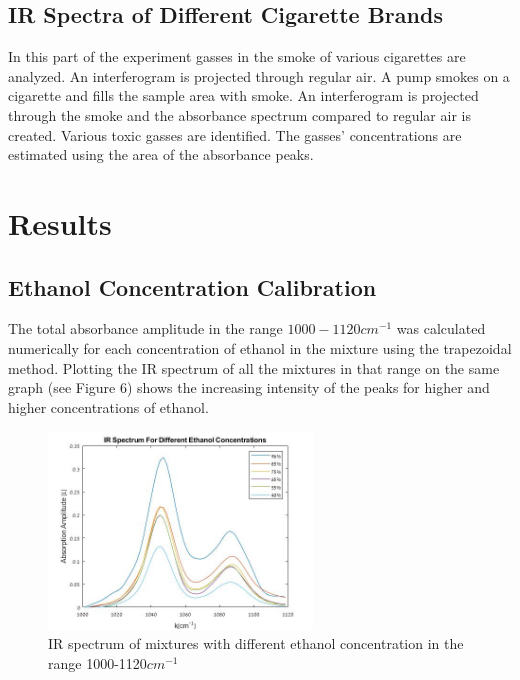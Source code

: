 \documentclass[reprint,amsmath,amssymb,aps, prl]{revtex4-2}
\begin{document}
\subsection{IR Spectra of Different Cigarette Brands}
In this part of the experiment gasses in the smoke of various cigarettes are analyzed. An interferogram is projected through regular air. A pump smokes on a cigarette and fills the sample area with smoke. An interferogram is projected through the smoke and the absorbance spectrum compared to regular air is created. Various toxic gasses are identified. The gasses' concentrations are estimated using the area of the absorbance peaks.

\section{Results}
\subsection{Ethanol Concentration Calibration}
The total absorbance amplitude in the range $1000-1120 cm^{-1}$ was calculated numerically for each concentration of ethanol in the mixture using the trapezoidal method\cite{numerical}. Plotting the IR spectrum of all the mixtures in that range on the same graph (see Figure 6) shows the increasing intensity of the peaks for higher and higher concentrations of ethanol. 
\begin{figure}[h]
    \includegraphics[width=7cm]{Images/EthanolAbsorption.jpg}
    \caption{IR spectrum of mixtures with different ethanol concentration in the range 1000-1120$cm^{-1}$ }
    \label{fig:EthanolMixtures}
    \centering
\end{figure}
\end{document}
